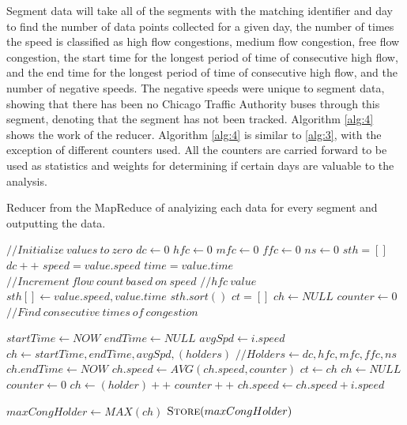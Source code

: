 \documentclass[titlepage,twocolumn]{article}
\begin{document}
\par Segment data will take all of the segments with the matching identifier and day to find the number of data points collected for a given day, the number of times the speed is classified as high flow congestions, medium flow congestion, free flow congestion, the start time for the longest period of time of consecutive high flow, and the end time for the longest period of time of consecutive high flow, and the number of negative speeds. The negative speeds were unique to segment data, showing that there has been no Chicago Traffic Authority buses through this segment, denoting that the segment has not been tracked. Algorithm \ref{alg:4} shows the work of the reducer. Algorithm \ref{alg:4} is similar to \ref{alg:3}, with the exception of different counters used. All the counters are carried forward to be used as statistics and weights for determining if certain days are valuable to the analysis.

\begin{algorithm}
	\small
	\caption{\small Reducer from the MapReduce of analyizing each data for every segment and outputting the data.}
	\label{alg:4}
	\begin{algorithmic}[1]
		\State $ // Initialize\ values\ to\ zero $
		\State $ dc \gets 0 $  
		\State $ hfc \gets 0 $  
		\State $ mfc \gets 0 $ 
		\State $ ffc \gets 0 $ 
		\State $ ns \gets 0 $ 
		\State $ sth = [] $ 
			\State $ dc++ $
			\State $ speed = value.speed $
			\State $ time = value.time $
			\State $ // Increment\ flow\ count\ based\ on\ speed $
				\State $ // hfc\ value $
				\State $ sth[] \gets value.speed, value.time $
			\EndIf
		\EndFor
		\State $ sth.sort() $ 
		\State $ ct = [] $ 
		\State $ ch \gets NULL $ 
		\State $ counter \gets 0 $ 
			\State $ // Find\ consecutive\ times\ of\ congestion  $
			
				\State $ startTime \gets NOW $
				\State $ endTime \gets NULL $
				\State $ avgSpd \gets i.speed $
				\State $ ch \gets startTime,endTime, avgSpd, (holders) $
				\State $ // Holders \gets dc,hfc,mfc,ffc,ns $
			\EndIf
				\State $ ch.endTime \gets NOW $
				\State $ ch.speed \gets  AVG(ch.speed, counter)$
				\State $ ct \gets ch $
				\State $ ch \gets NULL $ 
				\State $ counter \gets 0 $ 
			\EndIf
				\State $ ch \gets (holder)++ $
				\State $ counter++ $
				\State $ ch.speed \gets ch.speed + i.speed $
			\EndIf
		\EndFor
		
		\State $ maxCongHolder \gets MAX(ch) $
		\State $ \Call{Store}{maxCongHolder} $
		\EndProcedure
	\end{algorithmic}
\end{algorithm}
\end{document}

